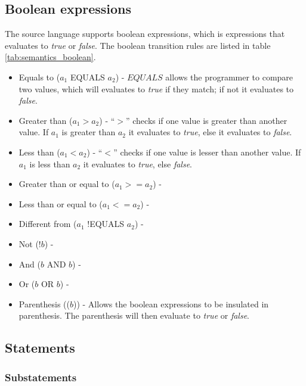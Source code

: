 \subsection{Boolean expressions}
The source language supports boolean expressions, which is expressions that evaluates to \textit{true} or \textit{false}. The boolean transition rules are listed in table \ref{tab:semantics_boolean}.
\begin{itemize}
	\item Equals to ($a_1$ EQUALS $a_2$) - $EQUALS$ allows the programmer to compare two values, which will evaluates to \textit{true} if they match; if not it evaluates to \textit{false}.
	\item Greater than ($a_1 > a_2$) - ``$>$'' checks if one value is greater than another value. If $a_1$ is greater than $a_2$ it evaluates to \textit{true}, else it evaluates to \textit{false}.
	\item Less than ($a_1 < a_2$) - ``$<$'' checks if one value is lesser than another value. If $a_1$ is less than $a_2$ it evaluates to \textit{true}, else \textit{false}.
	\item Greater than or equal to ($a_1 >= a_2$) - 
	\item Less than or equal to ($a_1 <= a_2$) - 
	\item Different from ($a_1$ !EQUALS $a_2$) - 
	\item Not (!$b$) -
	\item And ($b$ AND $b$) -
	\item Or ($b$ OR $b$) -
	\item Parenthesis (($b$)) - Allows the boolean expressions to be insulated in parenthesis. The parenthesis will then evaluate to \textit{true} or \textit{false}.
\end{itemize}
\subsection{Statements}

\subsubsection{Substatements}


